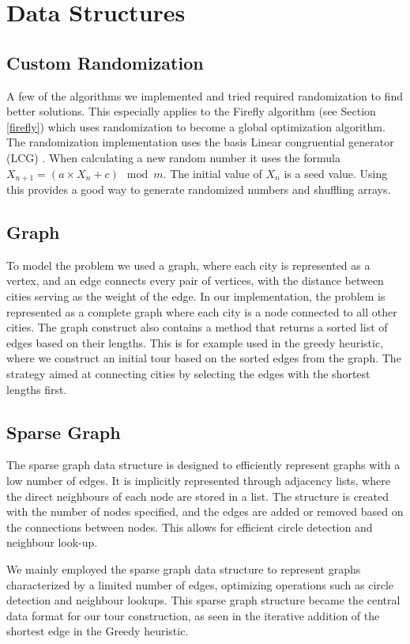 \documentclass{article}
\begin{document}
\section{Data Structures}
\subsection{Custom Randomization}
A few of the algorithms we implemented and tried required randomization to find better solutions. This especially applies to the Firefly algorithm (see Section \ref{firefly}) which uses randomization to become a global optimization algorithm. The randomization implementation uses the basis Linear congruential generator (LCG) \cite{eichenauer1986non}. When calculating a new random number it uses the formula \(X_{n+1} = (a\times X_n + c)\mod m\). The initial value of \(X_n\) is a seed value. Using this provides a good way to generate randomized numbers and shuffling arrays.

\subsection{Graph}

To model the problem we used a graph, where each city is represented as a vertex, and an edge connects every pair of vertices, with the distance between cities serving as the weight of the edge. In our implementation, the problem is represented as a complete graph where each city is a node connected to all other cities. The graph construct also contains a method that returns a sorted list of edges based on their lengths. This is for example used in the greedy heuristic, where we construct an initial tour based on the sorted edges from the graph. The strategy aimed at connecting cities by selecting the edges with the shortest lengths first. 

\subsection{Sparse Graph}
The sparse graph data structure is designed to efficiently represent graphs with a low number of edges. It is implicitly represented through adjacency lists, where the direct neighbours of each node are stored in a list. The structure is created with the number of nodes specified, and the edges are added or removed based on the connections between nodes. This allows for efficient circle detection and neighbour look-up. 

We mainly employed the sparse graph data structure to represent graphs characterized by a limited number of edges, optimizing operations such as circle detection and neighbour lookups. This sparse graph structure became the central data format for our tour construction, as seen in the iterative addition of the shortest edge in the Greedy heuristic.
\end{document}
